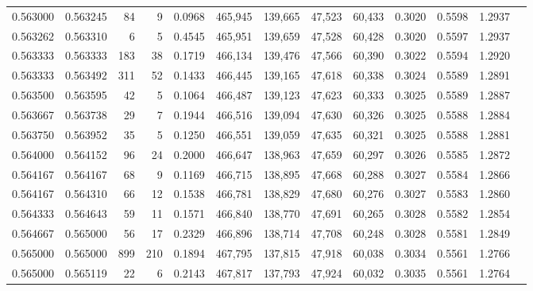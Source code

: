 \begin{tabular}{rrrrrrrrrrrrr}
0.563000 & 0.563245 &    84 &   9 &                                     0.0968 & 465,945 & 139,665 &  47,523 &  60,433 & 0.3020 & 0.5598 & 1.2937 \\
0.563262 & 0.563310 &     6 &   5 &                                     0.4545 & 465,951 & 139,659 &  47,528 &  60,428 & 0.3020 & 0.5597 & 1.2937 \\
0.563333 & 0.563333 &   183 &  38 &                                     0.1719 & 466,134 & 139,476 &  47,566 &  60,390 & 0.3022 & 0.5594 & 1.2920 \\
0.563333 & 0.563492 &   311 &  52 &                                     0.1433 & 466,445 & 139,165 &  47,618 &  60,338 & 0.3024 & 0.5589 & 1.2891 \\
0.563500 & 0.563595 &    42 &   5 &                                     0.1064 & 466,487 & 139,123 &  47,623 &  60,333 & 0.3025 & 0.5589 & 1.2887 \\
0.563667 & 0.563738 &    29 &   7 &                                     0.1944 & 466,516 & 139,094 &  47,630 &  60,326 & 0.3025 & 0.5588 & 1.2884 \\
0.563750 & 0.563952 &    35 &   5 &                                     0.1250 & 466,551 & 139,059 &  47,635 &  60,321 & 0.3025 & 0.5588 & 1.2881 \\
0.564000 & 0.564152 &    96 &  24 &                                     0.2000 & 466,647 & 138,963 &  47,659 &  60,297 & 0.3026 & 0.5585 & 1.2872 \\
0.564167 & 0.564167 &    68 &   9 &                                     0.1169 & 466,715 & 138,895 &  47,668 &  60,288 & 0.3027 & 0.5584 & 1.2866 \\
0.564167 & 0.564310 &    66 &  12 &                                     0.1538 & 466,781 & 138,829 &  47,680 &  60,276 & 0.3027 & 0.5583 & 1.2860 \\
0.564333 & 0.564643 &    59 &  11 &                                     0.1571 & 466,840 & 138,770 &  47,691 &  60,265 & 0.3028 & 0.5582 & 1.2854 \\
0.564667 & 0.565000 &    56 &  17 &                                     0.2329 & 466,896 & 138,714 &  47,708 &  60,248 & 0.3028 & 0.5581 & 1.2849 \\
0.565000 & 0.565000 &   899 & 210 &                                     0.1894 & 467,795 & 137,815 &  47,918 &  60,038 & 0.3034 & 0.5561 & 1.2766 \\
0.565000 & 0.565119 &    22 &   6 &                                     0.2143 & 467,817 & 137,793 &  47,924 &  60,032 & 0.3035 & 0.5561 & 1.2764 \\

\end{tabular}
